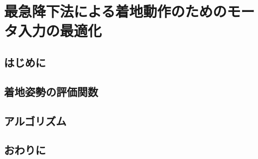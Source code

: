 \chapter[最急降下法による着地動作のためのモータ入力の最適化]%
        {最急降下法による着地動作のためのモータ入力の最適化}
    
    \section{はじめに}
    \section{着地姿勢の評価関数}
    \section{アルゴリズム}
    \section{おわりに}